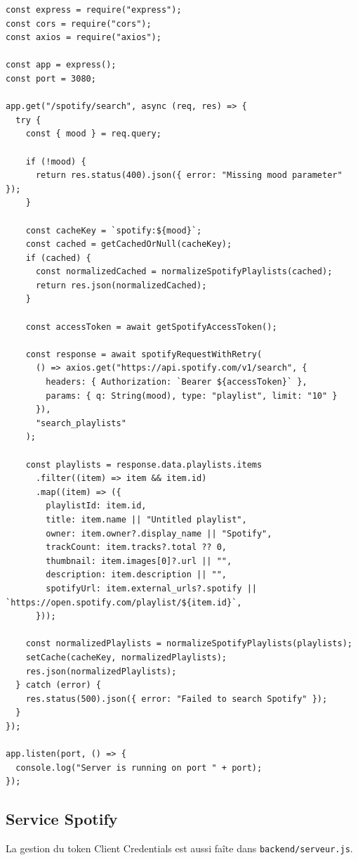 \documentclass[a4paper,11pt]{article}
\begin{document}
\begin{lstlisting}
const express = require("express");
const cors = require("cors");
const axios = require("axios");

const app = express();
const port = 3080;

app.get("/spotify/search", async (req, res) => {
  try {
    const { mood } = req.query;

    if (!mood) {
      return res.status(400).json({ error: "Missing mood parameter" });
    }

    const cacheKey = `spotify:${mood}`;
    const cached = getCachedOrNull(cacheKey);
    if (cached) {
      const normalizedCached = normalizeSpotifyPlaylists(cached);
      return res.json(normalizedCached);
    }

    const accessToken = await getSpotifyAccessToken();

    const response = await spotifyRequestWithRetry(
      () => axios.get("https://api.spotify.com/v1/search", {
        headers: { Authorization: `Bearer ${accessToken}` },
        params: { q: String(mood), type: "playlist", limit: "10" }
      }),
      "search_playlists"
    );

    const playlists = response.data.playlists.items
      .filter((item) => item && item.id)
      .map((item) => ({
        playlistId: item.id,
        title: item.name || "Untitled playlist",
        owner: item.owner?.display_name || "Spotify",
        trackCount: item.tracks?.total ?? 0,
        thumbnail: item.images[0]?.url || "",
        description: item.description || "",
        spotifyUrl: item.external_urls?.spotify || `https://open.spotify.com/playlist/${item.id}`,
      }));

    const normalizedPlaylists = normalizeSpotifyPlaylists(playlists);
    setCache(cacheKey, normalizedPlaylists);
    res.json(normalizedPlaylists);
  } catch (error) {
    res.status(500).json({ error: "Failed to search Spotify" });
  }
});

app.listen(port, () => {
  console.log("Server is running on port " + port);
});
\end{lstlisting}

\subsection{Service Spotify}

La gestion du token Client Credentials est aussi faîte dans \texttt{backend/serveur.js}.
\end{document}
